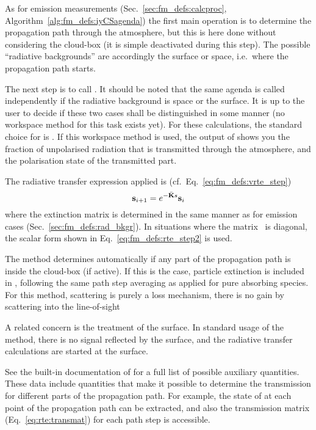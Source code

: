 As for emission measurements (Sec.~\ref{sec:fm_defs:calcproc},
Algorithm~\ref{alg:fm_defs:iyCSagenda}) the first main operation is to
determine the propagation path through the atmosphere, but this is here done
without considering the cloud-box (it is simple deactivated during this step).
The possible ``radiative backgrounds'' are accordingly the surface or space,
i.e.\ where the propagation path starts. 

The next step is to call . It should be
noted that the same agenda is called independently if the radiative background
is space or the surface. It is up to the user to decide if these two cases
shall be distinguished in some manner (no workspace method for this task exists
yet). For these calculations, the standard choice for
 is . If this
workspace method is used, the output of 
shows you the fraction of unpolarised radiation that is transmitted through the
atmosphere, and the polarisation state of the transmitted part.

The radiative transfer expression applied is
(cf.~Eq.~\ref{eq:fm_defs:vrte_step})
\begin{equation}
  \label{eq:trans:vrte}
  {\bf s}_{i+1} = e^{-\bar{{\bf K}}s} {\bf s}_i 
\end{equation}
where the extinction matrix is determined in the same manner as for emission
cases (Sec.~\ref{sec:fm_defs:rad_bkgr}). In situations where the matrix
\ExtMat\ is diagonal, the scalar form shown in Eq.~\ref{eq:fm_defs:rte_step2}
is used.

The method determines automatically if any part of the propagation path is
inside the cloud-box (if active). If this is the case, particle extinction is
included in \ExtMat, following the same path step averaging as applied for
pure absorbing species. For this method, scattering is purely a loss mechanism,
there is no gain by scattering into the line-of-sight

A related concern is the treatment of the surface. In standard usage of the
method, there is no signal reflected by the surface, and the radiative transfer
calculations are started at the surface.

See the built-in documentation of  for a
full list of possible auxiliary quantities. These data include quantities that
make it possible to determine the transmission for different parts of the
propagation path. For example, the state of  at each point of
the propagation path can be extracted, and also the transmission matrix
(Eq.~\ref{eq:rte:transmat}) for each path step is accessible.




